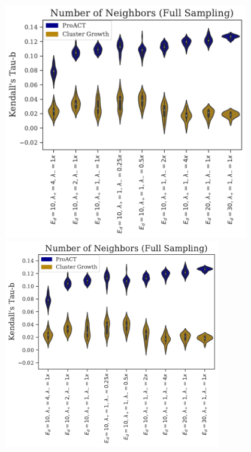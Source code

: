 \documentclass{article}
\begin{document}
\begin{center}
\includegraphics[trim=0.15in 0 0 3.5in,clip,width=4.2in]{proact.pdf}
\includegraphics[trim=0.79in 0 0 3.5in,clip,width=3.72in]{proact.pdf}
\end{center}
\end{document}
